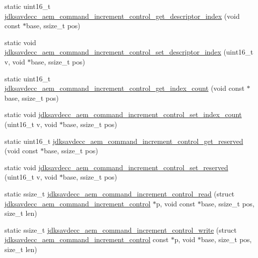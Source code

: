 \begin{DoxyCompactItemize}
\item 
static uint16\+\_\+t \hyperlink{group__command__increment__control_ga0222729b13a7e4af97ac69aa8e8e38a6}{jdksavdecc\+\_\+aem\+\_\+command\+\_\+increment\+\_\+control\+\_\+get\+\_\+descriptor\+\_\+index} (void const $\ast$base, ssize\+\_\+t pos)
\item 
static void \hyperlink{group__command__increment__control_gab95e6e76ba0630daabff1e5311f55ebf}{jdksavdecc\+\_\+aem\+\_\+command\+\_\+increment\+\_\+control\+\_\+set\+\_\+descriptor\+\_\+index} (uint16\+\_\+t v, void $\ast$base, ssize\+\_\+t pos)
\item 
static uint16\+\_\+t \hyperlink{group__command__increment__control_gaa605341ab9838f73c30693d858ee7fce}{jdksavdecc\+\_\+aem\+\_\+command\+\_\+increment\+\_\+control\+\_\+get\+\_\+index\+\_\+count} (void const $\ast$base, ssize\+\_\+t pos)
\item 
static void \hyperlink{group__command__increment__control_ga706737ef278b358e29118b78b10013d2}{jdksavdecc\+\_\+aem\+\_\+command\+\_\+increment\+\_\+control\+\_\+set\+\_\+index\+\_\+count} (uint16\+\_\+t v, void $\ast$base, ssize\+\_\+t pos)
\item 
static uint16\+\_\+t \hyperlink{group__command__increment__control_ga5b8f8d752c0ef07dd5be0a37080cd6b7}{jdksavdecc\+\_\+aem\+\_\+command\+\_\+increment\+\_\+control\+\_\+get\+\_\+reserved} (void const $\ast$base, ssize\+\_\+t pos)
\item 
static void \hyperlink{group__command__increment__control_ga569b84e807563d7598cbc8a548b0f406}{jdksavdecc\+\_\+aem\+\_\+command\+\_\+increment\+\_\+control\+\_\+set\+\_\+reserved} (uint16\+\_\+t v, void $\ast$base, ssize\+\_\+t pos)
\item 
static ssize\+\_\+t \hyperlink{group__command__increment__control_ga0cfa4b94841d7a0591ef87aef6ff9837}{jdksavdecc\+\_\+aem\+\_\+command\+\_\+increment\+\_\+control\+\_\+read} (struct \hyperlink{structjdksavdecc__aem__command__increment__control}{jdksavdecc\+\_\+aem\+\_\+command\+\_\+increment\+\_\+control} $\ast$p, void const $\ast$base, ssize\+\_\+t pos, size\+\_\+t len)
\item 
static ssize\+\_\+t \hyperlink{group__command__increment__control_gac3d22f76df8c19de8bf24a9adfbf3324}{jdksavdecc\+\_\+aem\+\_\+command\+\_\+increment\+\_\+control\+\_\+write} (struct \hyperlink{structjdksavdecc__aem__command__increment__control}{jdksavdecc\+\_\+aem\+\_\+command\+\_\+increment\+\_\+control} const $\ast$p, void $\ast$base, size\+\_\+t pos, size\+\_\+t len)
\end{DoxyCompactItemize}


